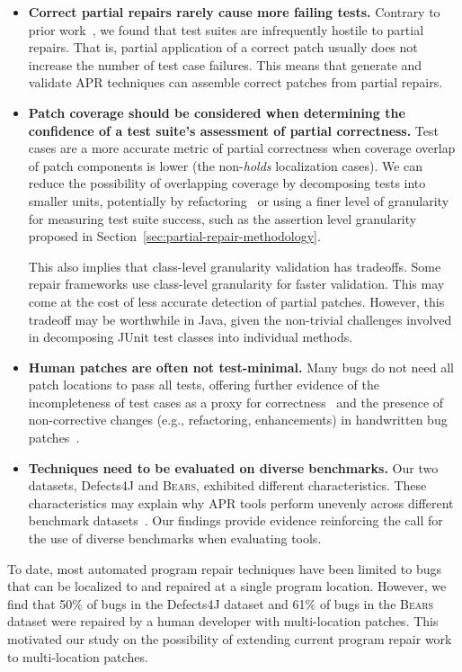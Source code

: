 \documentclass[10pt, conference]{IEEEtran}
\newcommand\bears{\textsc{Bears}\xspace}
\begin{document}
\begin{itemize}[wide, labelindent=0pt]
\item\textbf{Correct partial repairs rarely cause more failing tests.}
Contrary to prior work~\cite{gecco09}, we found that test suites are infrequently
hostile to partial repairs. That is, partial application of a correct patch
usually does not increase the number of test case failures. This means that
generate and validate APR techniques can assemble correct patches from partial repairs.

\item\textbf{Patch coverage should be considered when determining the
  confidence of a test suite's assessment of partial correctness.}
Test cases are a more accurate metric of partial correctness when coverage
overlap of patch components is lower (the non-\emph{holds} localization cases).
We can reduce the possibility of overlapping coverage by decomposing tests into
smaller units, potentially by
refactoring~\cite{b-refactoring} or using a finer level of granularity for
measuring test suite success, such as the assertion level granularity proposed
in Section~\ref{sec:partial-repair-methodology}.

This also implies that class-level granularity validation has tradeoffs. Some
repair frameworks use class-level granularity for faster validation. This may
come at the cost of less accurate detection of partial patches. However, this
tradeoff may be worthwhile in Java, given the non-trivial challenges involved in
decomposing JUnit test classes into individual methods.

\item\textbf{Human patches are often not test-minimal.}
Many bugs do not need all patch locations to pass all tests,
offering further evidence of the incompleteness of test cases as a
proxy for correctness~\cite{patch-correctness} and the
presence of non-corrective changes (e.g., refactoring, enhancements)
in handwritten bug patches~\cite{api-refactoring, tangledchanges}.

\item\textbf{Techniques need to be evaluated on diverse benchmarks.}
Our two datasets, Defects4J and \bears, exhibited different characteristics.
These characteristics may explain why APR tools perform unevenly across
different benchmark datasets~\cite{durieux-repair-them-all}. Our findings
provide evidence reinforcing the call for the use of diverse benchmarks when
evaluating tools.
\end{itemize}

To date, most automated program repair techniques have been limited to bugs that
can be localized to and repaired at a single program location. However, we find
that 50\% of bugs in the Defects4J dataset and 61\% of bugs in the \bears dataset
were repaired by a human developer with multi-location patches. This motivated
our study on the possibility of extending current program repair work to
multi-location patches.
\end{document}
